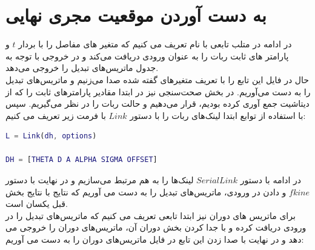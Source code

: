 \documentclass{article}
\begin{document}
\section{به دست آوردن موقعیت مجری نهایی}
در ادامه در متلب تابعی با نام  تعریف می کنیم که متغیر های مفاصل را با بردار $t$ و پارامتر های ثابت ربات را به عنوان ورودی دریافت می‌کند و در خروجی با توجه به جدول   ماتریس‌های تبدیل را خروجی می‌دهد.
\\
حال در فایل  این تابع را با تعریف متغیر‌های گفته شده صدا می‌زنیم و ماتریس‌های تبدیل را به دست می‌آوریم. در بخش صحت‌سنجی نیز در ابتدا مقادیر پارامتر‌های ثابت را که از دیتاشیت جمع آوری کرده بودیم، قرار می‌دهیم و حالت  ربات را در نظر می‌گیریم.
سپس با استفاده از توابع   ابتدا لینک‌های ربات را با دستور $Link$ با فرمت زیر تعریف می کنیم:
\begin{latin}
\begin{lstlisting}[language=matlab, caption=Peter Corke's Link, label=code:s1]
L = Link(dh, options)

DH = [THETA D A ALPHA SIGMA OFFSET]
\end{lstlisting}
\end{latin}
\noindent
در ادامه با دستور $SerialLink$ لینک‌ها را به هم مرتبط می‌سازیم و در نهایت با دستور $fkine$ و دادن   در ورودی، ماتریس‌های تبدیل را به دست می آوریم که نتایج با نتایج بخش قبل یکسان است.
\\
برای ماتریس های دوران نیز ابتدا تابعی تعریف می کنیم  که ماتریس‌های تبدیل را در ورودی دریافت کرده و با جدا کردن بخش دوران آن، ماتریس‌های دوران را خروجی می دهد و در نهایت با صدا زدن این تابع در فایل  ماتریس‌های دوران را به دست می آوریم:

\begin{latin}
%
\end{latin}
\end{document}
